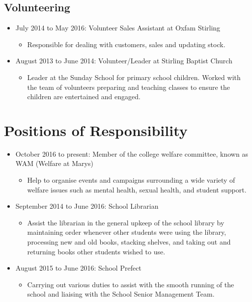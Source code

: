 \documentclass[10pt, a4paper]{article}
\begin{document}
	\subsection{Volunteering}
	\begin{itemize}
		\item July 2014 to May 2016: Volunteer Sales Assistant at Oxfam Stirling
		\begin{itemize}
			\item Responsible for dealing with customers, sales and updating stock.
		\end{itemize}
		\item August 2013 to June 2014: Volunteer/Leader at Stirling Baptist Church
		\begin{itemize}
			\item Leader at the Sunday School for primary school children. Worked with the team of volunteers preparing and teaching classes to ensure the children are entertained and engaged.
		\end{itemize}
	\end{itemize}
\section{Positions of Responsibility}
\begin{itemize}
	\item October 2016 to present: Member of the college welfare committee, known as WAM (Welfare at Mary\textquotesingle s)
	\begin{itemize}
		\item Help to organise events and campaigns surrounding a wide variety of welfare issues such as mental health, sexual health, and student support.
	\end{itemize}
	\item September 2014 to June 2016: School Librarian
	\begin{itemize}
		\item Assist the librarian in the general upkeep of the school library by maintaining order whenever other students were using the library, processing new and old books, stacking shelves, and taking out and returning books other students wished to use.
	\end{itemize}
	\item August 2015 to June 2016: School Prefect
	\begin{itemize}
		\item Carrying out various duties to assist with the smooth running of the school and liaising with the School Senior Management Team.
	\end{itemize}
\end{itemize}
\end{document}
